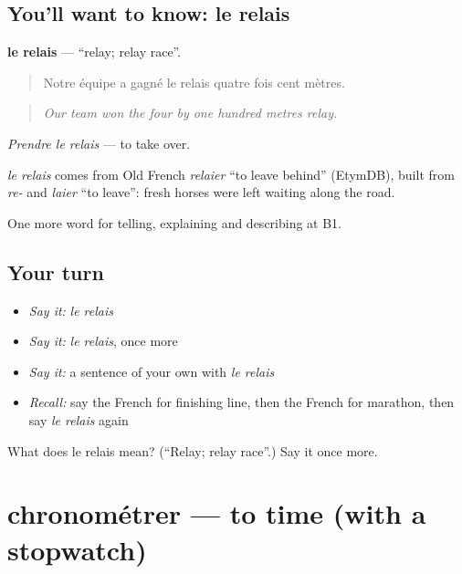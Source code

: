 \subsection*{You'll want to know: le relais}
\textbf{le relais} — \textquotedblleft{}relay; relay race\textquotedblright{}.

\begin{quote}
Notre équipe a gagné le relais quatre fois cent mètres.
\end{quote}

\begin{quote}
\emph{Our team won the four by one hundred metres relay.}
\end{quote}

\emph{Prendre le relais} — to take over.

\begin{cousinweb}
\emph{le relais} comes from Old French \emph{relaier} \textquotedblleft{}to leave behind\textquotedblright{} (EtymDB), built from \emph{re-} and \emph{laier} \textquotedblleft{}to leave\textquotedblright{}: fresh horses were left waiting along the road.
\end{cousinweb}

\begin{grammarlens}[title={What you've built}]
One more word for telling, explaining and describing at B1.
\end{grammarlens}

\subsection*{Your turn}
\begin{itemize}
\raggedright
  \item \emph{Say it:} \emph{le relais}
  \item \emph{Say it:} \emph{le relais}, once more
  \item \emph{Say it:} a sentence of your own with \emph{le relais}
  \item \emph{Recall:} say the French for finishing line, then the French for marathon, then say \emph{le relais} again
\end{itemize}

\begin{tcolorbox}[breakable,colback=teal!4,colframe=teal!35!black,title={Before you move on}]
What does le relais mean? (\textquotedblleft{}Relay; relay race\textquotedblright{}.) Say it once more.
\end{tcolorbox}
\section[chronométrer]{chronométrer — to time (with a stopwatch)}


